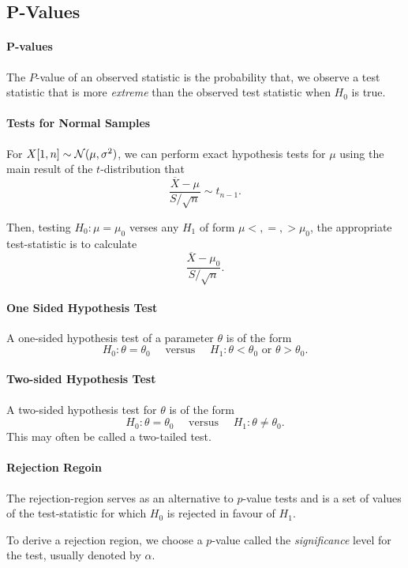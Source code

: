 \subsection{P-Values}

\paragraph{P-values}
The \(P\)-value of an observed statistic is the probability that,
we observe a test statistic that is more \textit{extreme} than the observed
test statistic when  \(H_0\) is true.

\paragraph{Tests for Normal Samples}
For \(X[1, n] \sim \mathcal{N}(\mu, \sigma^2)\), we can perform exact hypothesis tests
for \(\mu\) using the main result of the  \(t\)-distribution that \[
  \frac{\overline{X} - \mu}{S/\sqrt{n}} \sim t_{n - 1}
.\] 

Then, testing \(H_0: \mu = \mu_0\) verses any  \(H_1\) of form  \(\mu <, =, > \mu_0\),
the appropriate test-statistic is to calculate  \[
  \frac{\overline{X} - \mu_0}{S/\sqrt{n}}
.\] 


\paragraph{One Sided Hypothesis Test}
A one-sided hypothesis test of a parameter \(\theta\) is of the form \[
  H_0: \theta = \theta_0 \quad \text{ versus } \quad H_1: \theta < \theta_0 \text{ or } \theta > \theta_0
.\] 
\paragraph{Two-sided Hypothesis Test}
A two-sided hypothesis test for \(\theta\) is of the form \[
  H_0: \theta = \theta_0 \quad \text{ versus } \quad H_1: \theta \neq \theta_0
.\] This may often be called a two-tailed test.


\paragraph{Rejection Regoin}
The rejection-region serves as an alternative to \(p\)-value tests and is a set
of values of the test-statistic for which  \(H_0\) is rejected in favour of
 \(H_1\).

To derive a rejection region, we choose a \(p\)-value called the \textit{significance} level
for the test, usually denoted by \(\alpha\).

